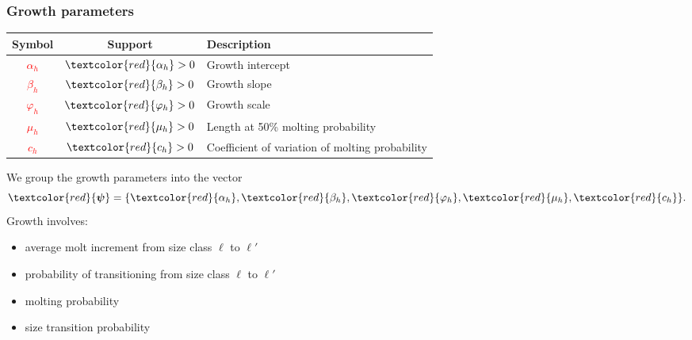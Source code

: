 \documentclass{beamer}
\begin{document}
\begin{frame}
\frametitle{Growth parameters}
\begin{table}
  \centering
  \begin{tabular}{ccl}
  \hline
  Symbol & Support & Description \\
  \hline
      \textcolor{red}{$\alpha_h$} & $\textcolor{red}{\alpha_h} > 0$ & Growth intercept \\
      \textcolor{red}{$\beta_h$} & $\textcolor{red}{\beta_h} > 0$ & Growth slope \\
      \textcolor{red}{$\varphi_h$} & $\textcolor{red}{\varphi_h} > 0$ & Growth scale \\
      \textcolor{red}{$\mu_h$} & $\textcolor{red}{\mu_h} > 0$ & Length at 50\% molting probability\\
      \textcolor{red}{$c_h$} & $\textcolor{red}{c_h} > 0$ & Coefficient of variation of molting probability\\
  \hline
  \end{tabular}
\end{table}
We group the growth parameters into the vector
\begin{equation*}
  \textcolor{red}{\boldsymbol\psi} = \{ \textcolor{red}{\alpha_h}, 
  \textcolor{red}{\beta_h}, \textcolor{red}{\varphi_h}, \textcolor{red}{\mu_h},
  \textcolor{red}{c_h} \}.
\end{equation*}
Growth involves:
\begin{itemize}
\item average molt increment from size class $\ell$ to $\ell'$
\item probability of transitioning from size class $\ell$ to $\ell'$
\item molting probability
\item size transition probability
\end{itemize}
\end{frame}

\end{document}
